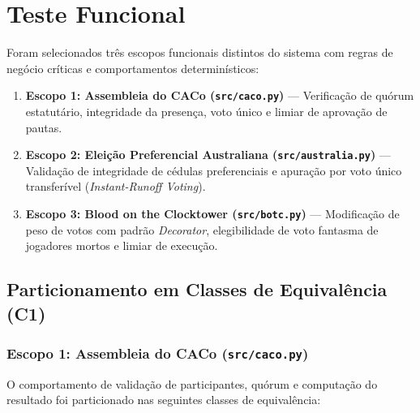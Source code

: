 \documentclass[12pt,a4paper]{article}
\begin{document}
\section{Teste Funcional}
Foram selecionados três escopos funcionais distintos do sistema com regras de negócio críticas e comportamentos determinísticos:
\begin{enumerate}
    \item \textbf{Escopo 1: Assembleia do CACo (\texttt{src/caco.py})} --- Verificação de quórum estatutário, integridade da presença, voto único e limiar de aprovação de pautas.
    \item \textbf{Escopo 2: Eleição Preferencial Australiana (\texttt{src/australia.py})} --- Validação de integridade de cédulas preferenciais e apuração por voto único transferível (\textit{Instant-Runoff Voting}).
    \item \textbf{Escopo 3: Blood on the Clocktower (\texttt{src/botc.py})} --- Modificação de peso de votos com padrão \textit{Decorator}, elegibilidade de voto fantasma de jogadores mortos e limiar de execução.
\end{enumerate}

\hypersetup{
    colorlinks=true,
    linkcolor=black,
    citecolor=black,
    filecolor=black,
    urlcolor=black
}

\subsection{Particionamento em Classes de Equivalência (C1)}

\subsubsection{Escopo 1: Assembleia do CACo (\texttt{src/caco.py})}
O comportamento de validação de participantes, quórum e computação do resultado foi particionado nas seguintes classes de equivalência:
\end{document}
